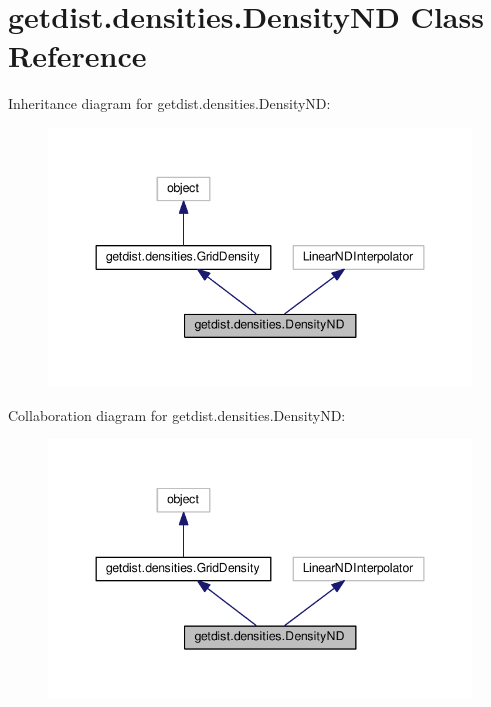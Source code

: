 \hypertarget{classgetdist_1_1densities_1_1DensityND}{}\section{getdist.\+densities.\+Density\+ND Class Reference}
\label{classgetdist_1_1densities_1_1DensityND}


Inheritance diagram for getdist.\+densities.\+Density\+ND\+:
\nopagebreak
\begin{figure}[H]
\begin{center}
\leavevmode
\includegraphics[width=347pt]{classgetdist_1_1densities_1_1DensityND__inherit__graph}
\end{center}
\end{figure}


Collaboration diagram for getdist.\+densities.\+Density\+ND\+:
\nopagebreak
\begin{figure}[H]
\begin{center}
\leavevmode
\includegraphics[width=347pt]{classgetdist_1_1densities_1_1DensityND__coll__graph}
\end{center}
\end{figure}

